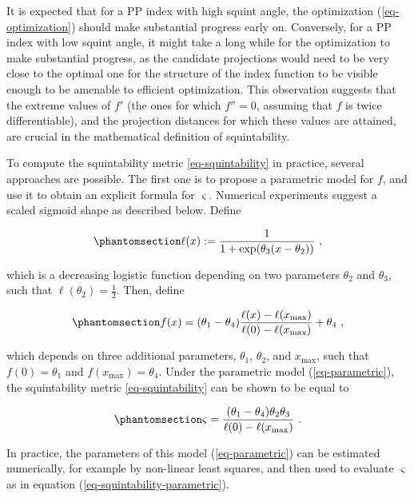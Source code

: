 \documentclass[
  12pt,
]{interact}
\theoremstyle{plain}
\begin{document}
It is expected that for a PP index with high squint angle, the
optimization (\ref{eq-optimization}) should make substantial progress
early on. Conversely, for a PP index with low squint angle, it might
take a long while for the optimization to make substantial progress, as
the candidate projections would need to be very close to the optimal one
for the structure of the index function to be visible enough to be
amenable to efficient optimization. This observation suggests that the
extreme values of \(f'\) (the ones for which \(f''=0\), assuming that
\(f\) is twice differentiable), and the projection distances for which
these values are attained, are crucial in the mathematical definition of
squintability.

To compute the squintability metric \eqref{eq-squintability} in
practice, several approaches are possible. The first one is to propose a
parametric model for \(f\), and use it to obtain an explicit formula for
\(\varsigma\). Numerical experiments suggest a scaled sigmoid shape as
described below. Define

\begin{equation}\phantomsection\label{eq-logistic}{
\ell(x):=\frac{1}{1+\exp(\theta_{3}(x-\theta_{2}))}\ ,
}\end{equation}

which is a decreasing logistic function depending on two parameters
\(\theta_2\) and \(\theta_3\), such that
\(\ell(\theta_{2})=\frac{1}{2}\). Then, define

\begin{equation}\phantomsection\label{eq-parametric}{
f(x)=(\theta_{1}-\theta_{4})\frac{\ell(x)-\ell(x_{\max})}{\ell(0)-\ell(x_{\max})}+\theta_{4}\ ,
}\end{equation}

which depends on three additional parameters, \(\theta_1\),
\(\theta_2\), and \(x_{\max}\), such that \(f(0)=\theta_1\) and
\(f(x_{\max})=\theta_4\). Under the parametric model
(\ref{eq-parametric}), the squintability metric \eqref{eq-squintability}
can be shown to be equal to

\begin{equation}\phantomsection\label{eq-squintability-parametric}{
\varsigma=\frac{(\theta_{1}-\theta_{4})\theta_{2}\theta_{3}}{\ell(0)-\ell(x_{\max})}\ .
}\end{equation}

In practice, the parameters of this model (\ref{eq-parametric}) can be
estimated numerically, for example by non-linear least squares, and then
used to evaluate \(\varsigma\) as in equation
(\ref{eq-squintability-parametric}).
\end{document}
